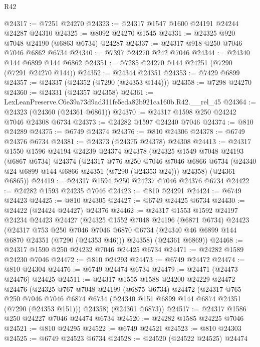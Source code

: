 \begin{lexlean}{R42}
\begin{coremodule}
{@24317 := @7251 @24270
@24323 := @24317 @1547 @1600 @24191 @24244 @24287 @24310
@24325 := @8092 @24270 @1545
@24331 := @24325 @920 @7048 @24190 (@6863 @6734) @24287
@24337 := @24317 @918 @250 @7046 @7046 @6862 @6734
@24340 := @7397 @24270 @242 @7046
@24344 := @24340 @144 @6899 @144 @6862
@24351 := @7285 @24270 @144 @24251 (@7290 (@7291 @24270 @144))
@24352 := @24344 @24351
@24353 := @7429 @6899
@24357 := @24337 (@24352 (@7290 (@24353 @144)))
@24358 := @7298 @24270
@24360 := @24331 (@24357 @24358)
@24361 := LexLeanPreserve.C6e39a73d9ad311fe5eda82b921ca160b.R42.__rel_45
@24364 := @24323 (@24360 (@24361 @6861))
@24370 := @24317 @1598 @250 @24242 @7046 @24308 @6734
@24373 := @24282 @1597 @24240 @7046
@24374 := @810 @24289
@24375 := @6749 @24374
@24376 := @810 @24306
@24378 := @6749 @24376 @6734
@24381 := @24373 (@24375 @24378) @24308
@24413 := @24317
    @1550
    @1596
    @24194
    @24239
    @24374
    @24378
    (@24325
      @1549
      @7048
      @24193
      (@6867 @6734)
      @24374
      (@24317
        @776
        @250
        @7046
        @7046
        @6866
        @6734
        (@24340 @24 @6899 @144 @6866 @24351 (@7290 (@24353 @24)))
        @24358)
      (@24361 @6865))
@24419 := @24317 @1594 @250 @24237 @7046 @24376 @6734
@24422 := @24282 @1593 @24235 @7046
@24423 := @810 @24291
@24424 := @6749 @24423
@24425 := @810 @24305
@24427 := @6749 @24425 @6734
@24430 := @24422 (@24424 @24427) @24376
@24462 := @24317
    @1553
    @1592
    @24197
    @24234
    @24423
    @24427
    (@24325
      @1552
      @7048
      @24196
      (@6871 @6734)
      @24423
      (@24317
        @753
        @250
        @7046
        @7046
        @6870
        @6734
        (@24340 @46 @6899 @144 @6870 @24351 (@7290 (@24353 @46)))
        @24358)
      (@24361 @6869))
@24468 := @24317 @1590 @250 @24232 @7046 @24425 @6734
@24471 := @24282 @1589 @24230 @7046
@24472 := @810 @24293
@24473 := @6749 @24472
@24474 := @810 @24304
@24476 := @6749 @24474 @6734
@24479 := @24471 (@24473 @24476) @24425
@24511 := @24317
    @1555
    @1588
    @24200
    @24229
    @24472
    @24476
    (@24325
      @767
      @7048
      @24199
      (@6875 @6734)
      @24472
      (@24317
        @765
        @250
        @7046
        @7046
        @6874
        @6734
        (@24340 @151 @6899 @144 @6874 @24351 (@7290 (@24353 @151)))
        @24358)
      (@24361 @6873))
@24517 := @24317 @1586 @250 @24227 @7046 @24474 @6734
@24520 := @24282 @1585 @24225 @7046
@24521 := @810 @24295
@24522 := @6749 @24521
@24523 := @810 @24303
@24525 := @6749 @24523 @6734
@24528 := @24520 (@24522 @24525) @24474
}
\end{coremodule}
\end{lexlean}
